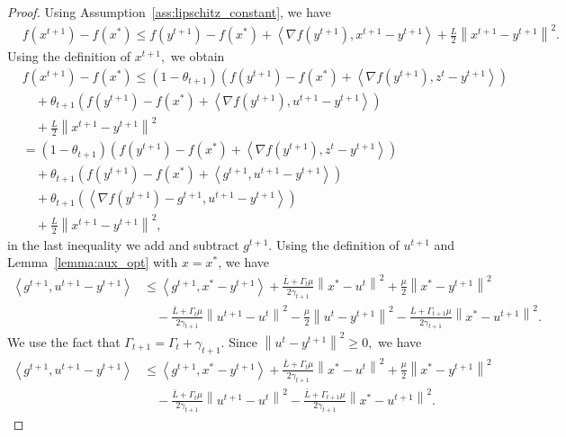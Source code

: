 \documentclass{article} %
\newcommand{\norm}[1]{\left\| #1 \right\|}
\newcommand{\inp}[2]{\left\langle#1,#2\right\rangle} %
\theoremstyle{plain}
\theoremstyle{definition}
\theoremstyle{remark}
\begin{document}
\begin{proof}
  Using Assumption~\ref{ass:lipschitz_constant}, we have
\begin{align*}
  &f(x^{t+1}) - f(x^*) \leq f(y^{t+1}) - f(x^*) + \inp{\nabla f(y^{t+1})}{x^{t+1} - y^{t+1}} + \frac{L}{2} \norm{x^{t+1} - y^{t+1}}^2.
\end{align*}
Using the definition of $x^{t+1},$ we obtain
\begin{equation}
\begin{aligned}
  &f(x^{t+1}) - f(x^*)\leq (1 - \theta_{t+1}) \left(f(y^{t+1}) - f(x^*) + \inp{\nabla f(y^{t+1})}{z^t - y^{t+1}}\right) \\
  &\quad+ \theta_{t+1} \left(f(y^{t+1}) - f(x^*) + \inp{\nabla f(y^{t+1})}{u^{t+1} - y^{t+1}}\right) \\
  &\quad+ \frac{L}{2} \norm{x^{t+1} - y^{t+1}}^2 \\
  &= (1 - \theta_{t+1}) \left(f(y^{t+1}) - f(x^*) + \inp{\nabla f(y^{t+1})}{z^t - y^{t+1}}\right) \\
  &\quad+ \theta_{t+1} \left(f(y^{t+1}) - f(x^*) + \inp{g^{t+1}}{u^{t+1} - y^{t+1}}\right) \\
  &\quad+ \theta_{t+1} \left(\inp{\nabla f(y^{t+1}) - g^{t+1}}{u^{t+1} - y^{t+1}}\right) \\
  &\quad+ \frac{L}{2} \norm{x^{t+1} - y^{t+1}}^2,
  \label{eq:tmp_1}
\end{aligned}
\end{equation}
in the last inequality we add and subtract $g^{t+1}.$
Using the definition of $u^{t+1}$ and Lemma~\ref{lemma:aux_opt} with $x = x^*$, we have
\begin{align*}
  \inp{g^{t+1}}{u^{t+1} - y^{t+1}} &\leq \inp{g^{t+1}}{x^* - y^{t+1}} + \frac{\bar{L} + \Gamma_{t} \mu}{2 \gamma_{t+1}} \norm{x^* - u^t}^2 + \frac{\mu}{2} \norm{x^* - y^{t+1}}^2 \\
  &\quad - \frac{\bar{L} + \Gamma_{t} \mu}{2 \gamma_{t+1}} \norm{u^{t+1} - u^t}^2 - \frac{\mu}{2} \norm{u^t - y^{t+1}}^2 - \frac{\bar{L} + \Gamma_{t+1} \mu}{2 \gamma_{t+1}} \norm{x^* - u^{t+1}}^2.
\end{align*}
We use the fact that $\Gamma_{t+1} = \Gamma_{t} + \gamma_{t+1}.$ Since $\norm{u^t - y^{t+1}}^2 \geq 0,$ we have
\begin{align*}
  \inp{g^{t+1}}{u^{t+1} - y^{t+1}} &\leq \inp{g^{t+1}}{x^* - y^{t+1}} + \frac{\bar{L} + \Gamma_{t} \mu}{2 \gamma_{t+1}} \norm{x^* - u^t}^2 + \frac{\mu}{2} \norm{x^* - y^{t+1}}^2 \\
  &\quad - \frac{\bar{L} + \Gamma_{t} \mu}{2 \gamma_{t+1}} \norm{u^{t+1} - u^t}^2 - \frac{\bar{L} + \Gamma_{t+1} \mu}{2 \gamma_{t+1}} \norm{x^* - u^{t+1}}^2.

\end{align*}
\end{proof}
\end{document}
